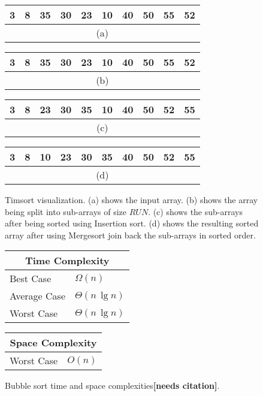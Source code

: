 \begin{figure}[!ht]
    \centering
    \begin{tabular}{|c|c|c|c|c|c|c|c|c|c|}
    \hline
    3 & 8 & 35 & 30 & 23 & 10 & 40 & 50 & 55 & 52 \\
    \hline
    \multicolumn{10}{c}{(a)} \\
    \end{tabular}
    \break
    \begin{tabular}{|c|c|c|c|c|c|c|c|c|c|}
    \hline
    3 & 8 & 35 & 30 & 23 & \cellcolor{lightgray}10 & \cellcolor{lightgray}40 & \cellcolor{lightgray}50 & \cellcolor{lightgray}55 & \cellcolor{lightgray}52 \\
    \hline
    \multicolumn{10}{c}{(b)} \\
    \end{tabular}
    \break
    \begin{tabular}{|c|c|c|c|c|c|c|c|c|c|}
    \hline
    3 & 8 & 23 & 30 & 35 & \cellcolor{lightgray}10 & \cellcolor{lightgray}40 & \cellcolor{lightgray}50 & \cellcolor{lightgray}52 & \cellcolor{lightgray}55 \\
    \hline
    \multicolumn{10}{c}{(c)} \\
    \end{tabular}
    \break
    \begin{tabular}{|c|c|c|c|c|c|c|c|c|c|}
    \hline
    \cellcolor{lightgray}3 & \cellcolor{lightgray}8 & \cellcolor{lightgray}10 & \cellcolor{lightgray}23 & \cellcolor{lightgray}30 & \cellcolor{lightgray}35 & \cellcolor{lightgray}40 & \cellcolor{lightgray}50 & \cellcolor{lightgray}52 & \cellcolor{lightgray}55 \\
    \hline
    \multicolumn{10}{c}{(d)} \\
    \end{tabular}
    
    \caption{Timsort visualization. (a) shows the input array. (b) shows the array being split into sub-arrays of size $RUN$. (c) shows the sub-arrays after being sorted using Insertion sort. (d) shows the resulting sorted array after using Mergesort join back the sub-arrays in sorted order.}
    \label{fig:timsort_ex}
\end{figure}

\begin{figure}[!ht]
    \centering
    \begin{tabular}{l|l}
    \multicolumn{2}{c}{\textbf{Time Complexity}} \\
    \hline
    Best Case    & $\Omega(n)$ \\
    Average Case & $\Theta(n \, \lg n)$ \\
    Worst Case   & $\Theta(n \, \lg n)$ \\
    \end{tabular}
    \quad\quad
    \begin{tabular}{l|l}
    \multicolumn{2}{c}{\textbf{Space Complexity}} \\
    \hline
    Worst Case   & $O(n)$
    \end{tabular}
    
    \caption{Bubble sort time\cite{clrs2009} and space complexities\textbf{[needs citation]}.}
    \label{fig:timsort}
\end{figure}

